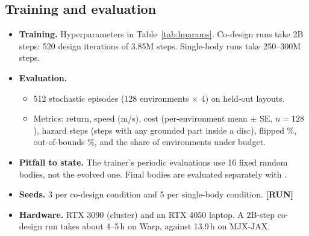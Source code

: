 \documentclass[sigconf,review]{acmart}
\newcommand{\statustag}[2]{\textcolor{#1}{\textsf{\scriptsize\bfseries[#2]}}}
\newcommand{\RUN}{\statustag{red!75!black}{RUN}\hspace{0.3em}}
\begin{document}
\subsection{Training and evaluation}
\begin{itemize}
\item \textbf{Training.} Hyperparameters in Table~\ref{tab:hparams}. Co-design runs take 2B steps: 520 design iterations of 3.85M steps. Single-body runs take 250--300M steps.
\item \textbf{Evaluation.}
  \begin{itemize}
  \item 512 stochastic episodes (128 environments $\times$ 4) on held-out layouts.
  \item Metrics: return, speed (m/s), cost (per-environment mean $\pm$ SE, $n = 128$), hazard steps (steps with any grounded part inside a disc), flipped \%, out-of-bounds \%, and the share of environments under budget.
  \end{itemize}
\item \textbf{Pitfall to state.} The trainer's periodic evaluations use 16 fixed random bodies, not the evolved one. Final bodies are evaluated separately with .
\item \textbf{Seeds.} 3 per co-design condition and 5 per single-body condition. \RUN
\item \textbf{Hardware.} RTX 3090 (cluster) and an RTX 4050 laptop. A 2B-step co-design run takes about 4--5\,h on Warp, against 13.9\,h on MJX-JAX.
\end{itemize}
\end{document}
